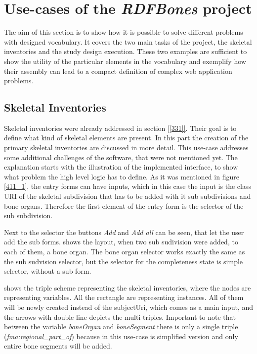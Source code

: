 

\section{Use-cases of the \textit{RDFBones} project}

The aim of this section is to show how it is possible to solve different problems with designed vocabulary. It covers the two main tasks of the project, the skeletal inventories and the study design execution. These two examples are sufficient to show the utility of the particular elements in the vocabulary and exemplify how their assembly can lead to a compact definition of complex web application problems.

\subsection{Skeletal Inventories}

Skeletal inventories were already addressed in section \ref{[331]}. Their goal is to define what kind of skeletal elements are present. In this part the creation of the primary skeletal inventories are discussed in more detail. This use-case addresses some additional challenges of the software, that were not mentioned yet.
The explanation starts with the illustration of the implemented interface, to show what problem the high level logic has to define. As it was mentioned in figure \ref{411_1}, the entry forms can have inputs, which in this case the input is the class URI of the skeletal subdivision that has to be added with it sub subdivisions and bone organs. Therefore the first element of the entry form is the selector of the sub subdivision.



Next to the selector the buttons \textit{Add} and \textit{Add all} can be seen, that let the user add the sub forms.  shows the layout, when two sub sudivision were added, to each of them, a bone organ. The bone organ selector works exactly the same as the sub sudvision selector, but the selector for the completeness state is simple selector, without a sub form. 

 shows the triple scheme representing the skeletal inventories, where the nodes are representing variables. All the rectangle are representing instances. All of them will be newly created instead of the subjectUri, which comes as a main input, and the arrows with double line depicts the multi triples. Important to note that between the variable \textit{boneOrgan} and \textit{boneSegment} there is only a single triple (\textit{fma:regional\_part\_of}) because in this use-case is simplified version and only entire bone segments will be added. 

